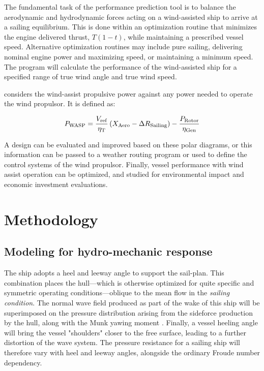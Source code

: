 \documentclass[twoside,twocolumn]{article}
\begin{document}
The fundamental task of the performance prediction tool is to balance the aerodynamic and hydrodynamic forces acting on a wind-assisted ship to arrive at a sailing equilibrium. This is done within an optimization routine that minimizes the engine delivered thrust, $T(1-t)$, while maintaining a prescribed vessel speed. Alternative optimization routines may include pure sailing, delivering nominal engine power and maximizing speed, or maintaining a minimum speed. The program will calculate the performance of the wind-assisted ship for a specified range of true wind angle and true wind speed. 

\PWASP considers the wind-assist propulsive power against any power needed to operate the wind propulsor. It is defined as:

\begin{equation}
P_{\mathrm{WASP}}=\frac{V_{\mathrm{ref}}}{\eta_{\mathrm{T}}} \left( X_{\mathrm{Aero}}-\Delta R_{\mathrm{Sailing}} \right) -\frac{P_{\mathrm{Rotor}}}{\eta_{\mathrm{Gen}}}
\label{eq:Pwasp}
\end{equation}

A design can be evaluated and improved based on these polar diagrams, or this information can be passed to a weather routing program or used to define the control systems of the wind propulsor. Finally, vessel performance with wind assist operation can be optimized, and studied for environmental impact and economic investment evaluations.

\section{Methodology}

\subsection{Modeling for hydro-mechanic response}

The ship adopts a heel and leeway angle to support the sail-plan. This combination places the hull---which is otherwise optimized for quite specific and symmetric operating conditions---oblique to the mean flow in the \textit{sailing condition}. The normal wave field produced as part of the wake of this ship will be superimposed on the pressure distribution arising from the sideforce production by the hull, along with the Munk yawing moment \cite{Munk1924}. Finally, a vessel heeling angle will bring the vessel "shoulders" closer to the free surface, leading to a further distortion of the wave system. The pressure resistance for a sailing ship will therefore vary with heel and leeway angles, alongside the ordinary Froude number dependency.
\end{document}

